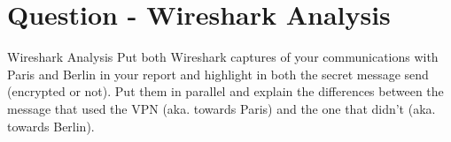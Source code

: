 \section{Question - Wireshark Analysis}

\begin{questionBox}{Wireshark Analysis}
    Put both Wireshark captures of your communications with Paris and Berlin in your report and highlight in both the secret message send (encrypted or not). Put them in parallel and explain the differences between the message that used the VPN (aka. towards Paris) and the one that didn't (aka. towards Berlin).
\end{questionBox}
